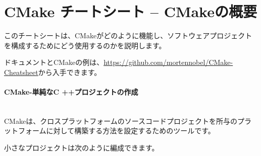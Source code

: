 \documentclass[11pt,a4paper,landscape]{scrartcl} %
\newcommand{\sectiontitle}[1]{\paragraph{#1} \ \\} %
\begin{document}


\section*{CMake チートシート -- CMakeの概要} %



\setlength{\columnsep}{1.5cm}
\begin{multicols}{2}



  
  このチートシートは、CMakeがどのように機能し、ソフトウェアプロジェクトを構成するためにどう使用するのかを説明します。
  
  ドキュメントとCMakeの例は、\url{https://github.com/mortennobel/CMake-Cheatsheet}から入手できます。
 

  \sectiontitle{CMake-単純なC ++プロジェクトの作成}
  

CMakeは、クロスプラットフォームのソースコードプロジェクトを所与のプラットフォームに対して構築する方法を設定するためのツールです。

  小さなプロジェクトは次のように編成できます。

  \vspace{\baselineskip} %

\noindent{}


\end{multicols}
\end{document}
